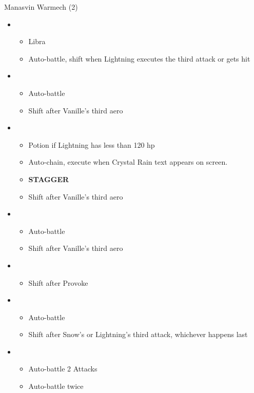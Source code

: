 \begin{paracol}{2}
	\begin{battle}{Manasvin Warmech (2)}
		\begin{itemize}
			\item \third
			      \begin{itemize}
				      \item Libra
				      \item Auto-battle, shift when Lightning executes the third attack or gets hit
			      \end{itemize}
			\item \fourth
			      \begin{itemize}
				      \item Auto-battle
				      \item Shift after Vanille's third aero
			      \end{itemize}
			\item \first
			      \begin{itemize}
				      \item Potion if Lightning has less than 120 hp
				      \item Auto-chain, execute when Crystal Rain text appears on screen.
				      \item \textbf{STAGGER}
				      \item Shift after Vanille's third aero
			      \end{itemize}
			\item \third
			      \begin{itemize}
				      \item Auto-battle
				      \item Shift after Vanille's third aero
			      \end{itemize}
			\item \second
			      \begin{itemize}
				      \item Shift after Provoke
			      \end{itemize}
			\item \third
			      \begin{itemize}
				      \item Auto-battle
				      \item Shift after Snow's or Lightning's third attack, whichever happens last
			      \end{itemize}
			\item \fourth
			      \begin{itemize}
				      \item Auto-battle 2 Attacks
				      \item Auto-battle twice

\end{itemize}
\end{itemize}
\end{battle}
\end{paracol}
